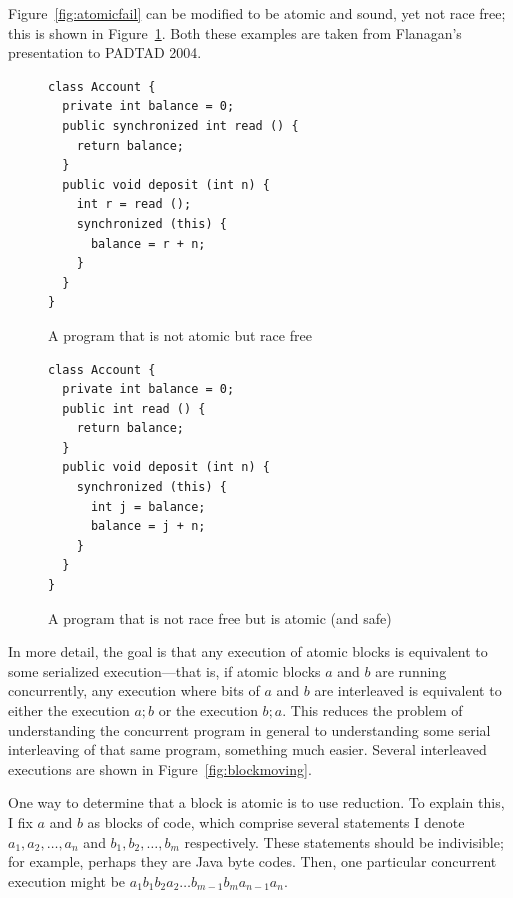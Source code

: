 \documentclass{article}
\begin{document}
\begin{multicols}{2}
Figure~\ref{fig:atomicfail} can be modified to be atomic and sound,
yet not race free; this is shown in Figure~\ref{fig:atomicsuccess}.
Both these examples are taken from Flanagan's presentation to PADTAD
2004.

\begin{figure}
  \hfill
  \begin{minipage}[t]{.45\textwidth}
    \begin{center}
      \begin{small}
\begin{verbatim}
class Account {
  private int balance = 0;
  public synchronized int read () {
    return balance;
  }
  public void deposit (int n) {
    int r = read ();
    synchronized (this) {
      balance = r + n;
    }
  }
}
\end{verbatim}
      \end{small}
      \caption{A program that is not atomic but race free}
      \label{fig:atomicfail}
    \end{center}
  \end{minipage}
  \hfill
  \begin{minipage}[t]{.45\textwidth}
    \begin{center}
      \begin{small}
\begin{verbatim}
class Account {
  private int balance = 0;
  public int read () {
    return balance;
  }
  public void deposit (int n) {
    synchronized (this) {
      int j = balance;
      balance = j + n;
    }
  }
}
\end{verbatim}
        \caption{A program that is not race free but is atomic (and safe)}
        \label{fig:atomicsuccess}
      \end{small}
    \end{center}
  \end{minipage}
  \hfill
\end{figure}

In more detail, the goal is that any execution of atomic blocks is
equivalent to some serialized execution---that is, if atomic blocks
$a$ and $b$ are running concurrently, any execution where bits of $a$
and $b$ are interleaved is equivalent to either the execution $a;b$
or the execution $b;a$.  This reduces the problem of understanding
the concurrent program in general to understanding some serial
interleaving of that same program, something much easier.  Several
interleaved executions are shown in Figure~\ref{fig:blockmoving}.

One way to determine that a block is atomic is to use reduction.  To
explain this, I fix $a$ and $b$ as blocks of code, which comprise
several statements I denote $a_1, a_2, \dots, a_n$ and $b_1, b_2,
\dots, b_m$ respectively.  These statements should be indivisible; for
example, perhaps they are Java byte codes.  Then, one particular
concurrent execution might be $a_1 b_1 b_2 a_2 \dots b_{m-1} b_m
a_{n-1} a_n$.


\end{multicols}
\end{document}
